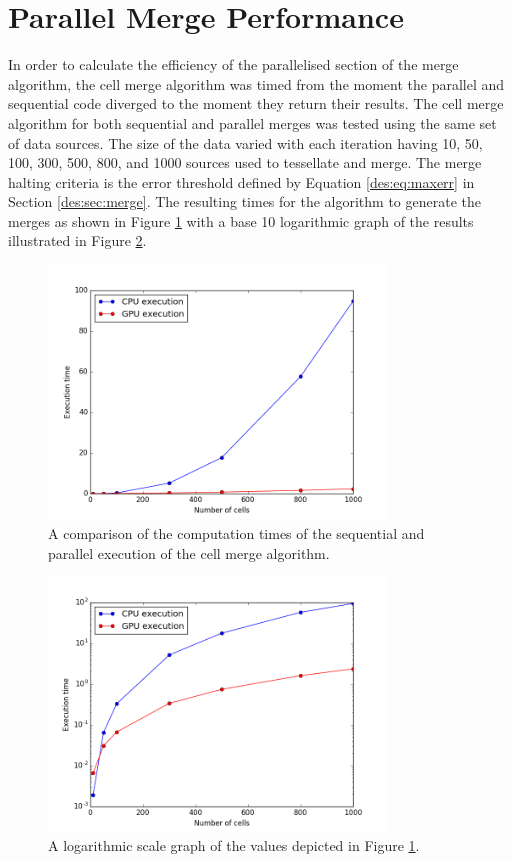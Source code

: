 \section{Parallel Merge Performance}
In order to calculate the efficiency of the parallelised section of the merge algorithm, the cell merge algorithm was timed from the moment the parallel and sequential code diverged to the moment they return their results. The cell merge algorithm for both sequential and parallel merges was tested using the same set of data sources. The size of the data varied with each iteration having 10, 50, 100, 300, 500, 800, and 1000 sources used to tessellate and merge. The merge halting criteria is the error threshold defined by Equation \ref{des:eq:maxerr} in Section \ref{des:sec:merge}. The resulting times for the algorithm to generate the merges as shown in Figure \ref{res:fig:cvg} with a base 10 logarithmic graph of the results illustrated in Figure \ref{res:fig:cvg_1og}.
\begin{figure}[H]
\centering
\includegraphics[width=0.8\textwidth]{Images/result_cvg.png}
\caption{A comparison of the computation times of the sequential and parallel execution of the cell merge algorithm.}
\label{res:fig:cvg}
\end{figure}
\begin{figure}[H]
\centering
\includegraphics[width=0.8\textwidth]{Images/result_cvg_log.png}
\caption{A logarithmic scale graph of the values depicted in Figure \ref{res:fig:cvg}.}
\label{res:fig:cvg_1og}
\end{figure}
